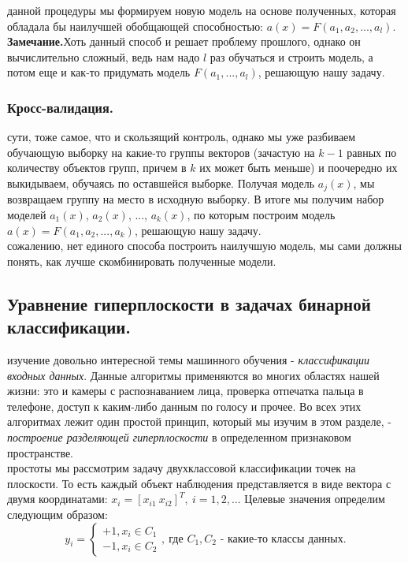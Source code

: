 \documentclass[a4paper,12pt]{article}
\begin{document}
 данной процедуры мы формируем новую модель на основе полученных, которая обладала бы наилучшей обобщающей способностью: $a(x) = F(a_1,a_2, ..., a_l)$.\\

\noindent\textbf{Замечание.}Хоть данный способ и решает проблему прошлого, однако он вычислительно сложный, ведь нам надо $l$ раз обучаться и строить модель, а потом еще и как-то придумать модель $F(a_1,..., a_l)$, решающую нашу задачу.

\subsubsection{Кросс-валидация.}
 сути, тоже самое, что и скользящий контроль, однако мы уже разбиваем обучающую выборку на какие-то группы векторов (зачастую на $k-1$ равных по количеству объектов групп, причем в $k$ их может быть меньше) и поочередно их выкидываем, обучаясь по оставшейся выборке. Получая модель $a_j(x)$, мы возвращаем группу на место в исходную выборку. В итоге мы получим набор моделей $a_1(x)$, $a_2(x)$, ..., $a_k(x)$, по которым построим модель $a(x)=F(a_1,a_2,...,a_k)$, решающую нашу задачу.\\

 сожалению, нет единого способа построить наилучшую модель, мы сами должны понять, как лучше скомбинировать полученные модели.

\subsection{Уравнение гиперплоскости в задачах бинарной классификации.}
 изучение довольно интересной темы машинного обучения - \textit{классификации входных данных}. Данные алгоритмы применяются во многих областях нашей жизни: это и камеры с распознаванием лица, проверка отпечатка пальца в телефоне, доступ к каким-либо данным по голосу и прочее. Во всех этих алгоритмах лежит один простой принцип, который мы изучим в этом разделе, - \textit{построение разделяющей гиперплоскости} в определенном признаковом пространстве.\\

 простоты мы рассмотрим задачу двухклассовой классификации точек на плоскости. То есть каждый объект наблюдения представляется в виде вектора с двумя координатами: $x_i = [x_{i1} \ x_{i2}]^T, \ i=1,2,..$. Целевые значения определим следующим образом:
\begin{equation*}
    y_i=
    \begin{cases}
        +1, x_i\in C_1 \\
        -1, x_i\in C_2
    \end{cases}
    , \ \text{где }C_1, C_2 \text{ - какие-то классы данных.} 
\end{equation*}
\end{document}
